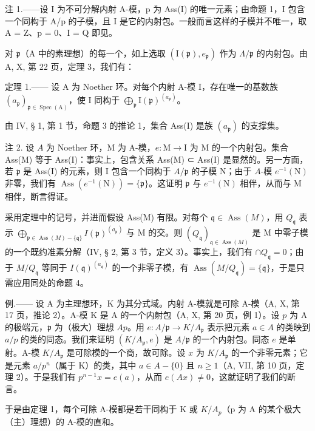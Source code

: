 注 1.——设 I 为不可分解内射 A-模，p 为 Ass(I) 的唯一元素；由命题 1，I 包含一个同构于 A/p 的子模，且 I 是它的内射包。一般而言这样的子模并不唯一，取 A = Z、p = 0、I = Q 即见。

对 \(\mathfrak{p}\)（\(\mathrm{A}\) 中的素理想）的每一个，如上选取 \((\mathrm{I}(\mathfrak{p}), e_{\mathfrak{p}})\) 作为 \(\Lambda/\mathfrak{p}\) 的内射包。由 \(\mathrm{A}\), X, 第 22 页，定理 3，我们有：

定理 1.—— 设 A 为 Noether 环。对每个内射 A-模 I，存在唯一的基数族 \((a_{\mathfrak{p}})_{\mathfrak{p}\in\operatorname{Spec}(\mathrm{A})}\)，使 I 同构于 \(\bigoplus_{\mathfrak{p}}\mathrm{I}(\mathfrak{p})^{(a_{\mathfrak{p}})}\)。

由 IV, § 1, 第 1 节，命题 3 的推论 1，集合 Ass(I) 是族 \((a_{\mathfrak{p}})\) 的支撑集。

注 2. 设 \(A\) 为 Noether 环，M 为 A-模，\(e: \mathrm{M} \to \mathrm{I}\) 为 M 的一个内射包。集合 Ass(M) 等于 Ass(I)：事实上，包含关系 Ass(M) ⊂ Ass(I) 是显然的。另一方面，若 \(\mathfrak{p}\) 是 Ass(I) 的元素，则 I 包含一个同构于 \(A/\mathfrak{p}\) 的子模 N；由于 \(A\)-模 \(e^{-1}(\mathrm{N})\) 非零，我们有 \(\operatorname{Ass}(e^{-1}(\mathrm{N})) = \{\mathfrak{p}\}\)。这证明 \(\mathfrak{p}\) 与 \(e^{-1}(\mathrm{N})\) 相伴，从而与 M 相伴，断言得证。

采用定理中的记号，并进而假设 Ass(M) 有限。对每个 \(\mathfrak{q} \in \operatorname{Ass}(M)\)，用 \(Q_{\mathfrak{q}}\) 表示 \(\bigoplus_{\mathfrak{p} \in \operatorname{Ass}(M) - \{\mathfrak{q}\}} I(\mathfrak{p})^{(a_{\mathfrak{p}})}\) 与 M 的交。则 \((Q_{\mathfrak{q}})_{\mathfrak{q} \in \operatorname{Ass}(M)}\) 是 M 中零子模的一个既约准素分解（IV, § 2, 第 3 节，定义 3）。事实上，我们有 \(\cap Q_{\mathfrak{q}} = 0\)；由于 \(M/Q_{\mathfrak{q}}\) 等同于 \(I(\mathfrak{q})^{(a_{\mathfrak{q}})}\) 的一个非零子模，有 \(\operatorname{Ass}(M/Q_{\mathfrak{q}}) = \{\mathfrak{q}\}\)，于是只需应用同处的命题 4。

例.—— 设 A 为主理想环，K 为其分式域。内射 A-模就是可除 A-模（A, X, 第 17 页，推论 2）。A-模 K 是 A 的一个内射包（A, X, 第 20 页，例 1）。设 \(p\) 为 A 的极端元，\(\mathfrak{p}\) 为（极大）理想 \(Ap\)。用 \(e: A/\mathfrak{p} \longrightarrow K/A_{\mathfrak{p}}\) 表示把元素 \(a \in A\) 的类映到 \(a/p\) 的类的同态。我们来证明 \((K/A_{\mathfrak{p}}, e)\) 是 \(A/\mathfrak{p}\) 的一个内射包。同态 \(e\) 是单射。A-模 \(K/A_{\mathfrak{p}}\) 是可除模的一个商，故可除。设 \(x\) 为 \(K/A_{\mathfrak{p}}\) 的一个非零元素；它是元素 \(a/p^n\)（属于 K）的类，其中 \(a \in A - \{0\}\) 且 \(n \geqslant 1\)（A, VII, 第 10 页，定理 2）。于是我们有 \(p^{n-1}x = e(a)\)，从而 \(e(Ax) \neq 0\)，这就证明了我们的断言。

于是由定理 1，每个可除 A-模都是若干同构于 K 或 \(K/A_{p}\)（p 为 A 的某个极大（主）理想）的 A-模的直和。

